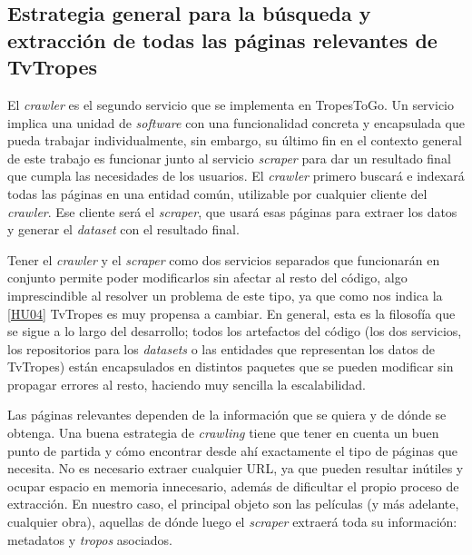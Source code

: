\subsection{Estrategia general para la búsqueda y extracción de todas las páginas relevantes de TvTropes}
El \textit{crawler} es el segundo servicio que se implementa en TropesToGo. Un
servicio implica una unidad de \textit{software} con una funcionalidad concreta
y encapsulada que pueda trabajar individualmente, sin embargo, su último fin
en el contexto general de este trabajo es funcionar junto al servicio
\textit{scraper} para dar un resultado final que cumpla las necesidades de los
usuarios. El \textit{crawler} primero buscará e indexará todas las páginas en
una entidad común, utilizable por cualquier cliente del \textit{crawler}. Ese
cliente será el \textit{scraper}, que usará esas páginas para extraer los datos
y generar el \textit{dataset} con el resultado final. 

Tener el \textit{crawler} y el \textit{scraper} como dos servicios separados que
funcionarán en conjunto permite poder modificarlos sin afectar al resto del
código, algo imprescindible al resolver un problema de este tipo, ya que como
nos indica la \href{https://github.com/jlgallego99/TropesToGo/issues/9}{[HU04]}
TvTropes es muy propensa a cambiar. En general, esta es la filosofía que se
sigue a lo largo del desarrollo; todos los artefactos del código (los dos
servicios, los repositorios para los \textit{datasets} o las entidades que
representan los datos de TvTropes) están encapsulados en distintos paquetes que
se pueden modificar sin propagar errores al resto, haciendo muy sencilla la
escalabilidad.

Las páginas relevantes dependen de la información que se quiera y de dónde se
obtenga. Una buena estrategia de \textit{crawling} tiene que tener en cuenta un
buen punto de partida y cómo encontrar desde ahí exactamente el tipo de páginas
que necesita. No es necesario extraer cualquier URL, ya que pueden resultar
inútiles y ocupar espacio en memoria innecesario, además de dificultar el propio
proceso de extracción. En nuestro caso, el principal objeto son las películas (y
más adelante, cualquier obra), aquellas de dónde luego el \textit{scraper}
extraerá toda su información: metadatos y \textit{tropos} asociados.


